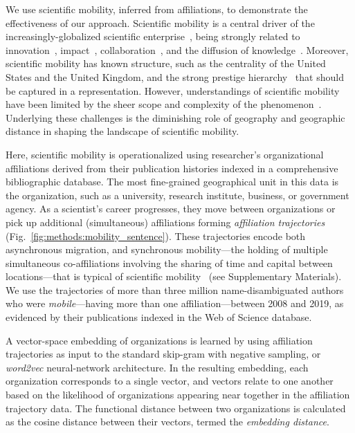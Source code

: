 \documentclass[12pt]{article} %
\begin{document}
We use scientific mobility, inferred from affiliations, to demonstrate the effectiveness of our approach.
Scientific mobility is a central driver of the increasingly-globalized scientific enterprise~\autocite{czaika2018globalisation, altbach2004globalization, box2008competition}, being strongly related to innovation~\autocite{braunerhjelm2020labor, kaiser2018innovation, armano2017innovation}, impact~\autocite{sugimoto2017mostimpact, petersen2018multiscale, franzoni2014advantage}, collaboration~\autocite{rodrigues2016mobility}, and the diffusion of knowledge~\autocite{braunerhjelm2020labor, azoulay2011diffusion, morgan2018prestige}.
Moreover, scientific mobility has known structure, such as the centrality of the United States and the United Kingdom, and the strong prestige hierarchy~\autocite{auriol2010careers, clauset2015hierarchy, deville2014career} that should be captured in a representation.
However, understandings of scientific mobility have been limited by the sheer scope and complexity of the phenomenon~\autocite{robinson2019mobility, vannoorden2012mobility, deville2014career, ackers2008mobility, scott2015dynamics}.
Underlying these challenges is the diminishing role of geography and geographic distance in shaping the landscape of scientific mobility.

Here, scientific mobility is operationalized using researcher's organizational affiliations derived from their publication histories indexed in a comprehensive bibliographic database. 
The most fine-grained geographical unit in this data is the organization, such as a university, research institute, business, or government agency.
As a scientist's career progresses, they move between organizations or pick up additional (simultaneous) affiliations forming \textit{affiliation trajectories} (Fig.~\ref{fig:methods:mobility_sentence}).
These trajectories encode both asynchronous migration, and synchronous mobility---the holding of multiple simultaneous co-affiliations involving the sharing of time and capital between locations---that is typical of scientific mobility~\autocite{rodrigues2016mobility, markova2016synchronous, sugimoto2017mostimpact} (see Supplementary Materials).
We use the trajectories of more than three million name-disambiguated authors who were \textit{mobile}---having more than one affiliation---between 2008 and 2019, as evidenced by their publications indexed in the Web of Science database.


A vector-space embedding of organizations is learned by using affiliation trajectories as input to the standard skip-gram with negative sampling, or \textit{word2vec} neural-network architecture.
In the resulting embedding, each organization corresponds to a single vector, and vectors relate to one another based on the likelihood of organizations appearing near together in the affiliation trajectory data. 
The functional distance between two organizations is calculated as the cosine distance between their vectors, termed the \textit{embedding distance}.
\end{document}
